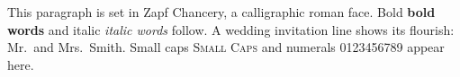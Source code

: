 \documentclass{article}
\begin{document}
This paragraph is set in Zapf Chancery, a calligraphic roman face.
Bold \textbf{bold words} and italic \textit{italic words} follow.
A wedding invitation line shows its flourish: Mr.\ and Mrs.\ Smith.
Small caps \textsc{Small Caps} and numerals 0123456789 appear here.
\end{document}
